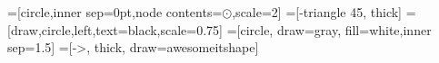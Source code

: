 \DeclareMathOperator{\im}{im}

\DeclareMathOperator{\id}{id}

\DeclareMathOperator{\mcm}{mcm}

\DeclareMathOperator{\Arg}{Arg}

\DeclareMathOperator{\sgn}{sgn}

\DeclareMathOperator{\degr}{deg}

\DeclareMathOperator{\Sym}{Sym}

\DeclareMathOperator{\adj}{adj}

\DeclareMathOperator{\diag}{diag}

\DeclareMathOperator{\defeq}{\vcentcolon=}
\DeclareMathOperator{\eqdef}{=\vcentcolon}


=[circle,inner sep=0pt,node contents={$\odot$},scale=2]
=[-triangle 45, thick]
=[draw,circle,left,text=black,scale=0.75]
=[circle, draw=gray, fill=white,inner sep=1.5]
=[->, thick, draw=awesomeitshape]
